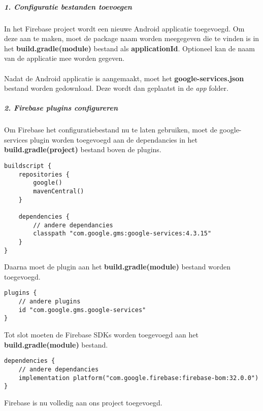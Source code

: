 \subparagraph{1. Configuratie bestanden toevoegen}
In het Firebase project wordt een nieuwe Android applicatie toegevoegd. Om deze aan te maken, moet de package naam 
worden meegegeven die te vinden is in het \textbf{build.gradle(module)} bestand als \textbf{applicationId}.
Optioneel kan de naam van de applicatie mee worden gegeven.
\\\\
Nadat de Android applicatie is aangemaakt, moet het \textbf{google-services.json} bestand worden gedownload. 
Deze wordt dan geplaatst in de \textit{app} folder.

\subparagraph{2. Firebase plugins configureren}
Om Firebase het configuratiebestand nu te laten gebruiken, moet de google-services plugin worden toegevoegd aan 
de dependancies in het \textbf{build.gradle(project)} bestand boven de plugins. 
\begin{verbatim}
buildscript {
    repositories {
        google()
        mavenCentral()
    }

    dependencies {
        // andere dependancies
        classpath "com.google.gms:google-services:4.3.15"
    }
}
\end{verbatim}
Daarna moet de plugin aan het \textbf{build.gradle(module)} bestand worden toegevoegd.
\begin{verbatim}
plugins {
    // andere plugins 
    id "com.google.gms.google-services"
}
\end{verbatim}
Tot slot moeten de Firebase SDKs worden toegevoegd aan het \textbf{build.gradle(module)} bestand.
\begin{verbatim}
dependencies {
    // andere dependancies
    implementation platform("com.google.firebase:firebase-bom:32.0.0")
}
\end{verbatim}
Firebase is nu volledig aan ons project toegevoegd.